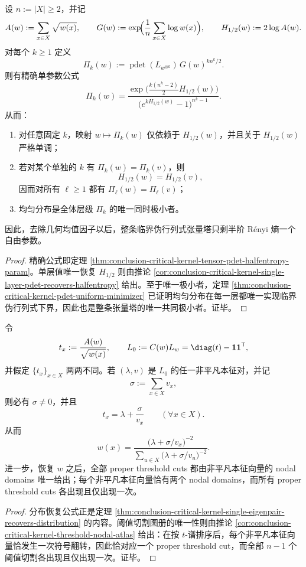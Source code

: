 \begin{theorem}[临界最优核张量塔的半熵刚性]\label{thm:conclusion-endpoint-halfentropy-pdet-tower-rigidity}
设 \(n:=|X|\ge 2\)，并记
\[
A(w):=\sum_{x\in X}\sqrt{w(x)},
\qquad
G(w):=\exp\!\Bigl(\frac1n\sum_{x\in X}\log w(x)\Bigr),
\qquad
H_{1/2}(w):=2\log A(w).
\]
对每个 \(k\ge 1\) 定义
\[
\Pi_k(w):=\operatorname{pdet}(L_{w^{\otimes k}})\,G(w)^{k n^k/2}.
\]
则有精确单参数公式
\[
\Pi_k(w)
=
\frac{\exp\!\bigl(\frac{k(n^k-2)}{2}H_{1/2}(w)\bigr)}
{\bigl(e^{kH_{1/2}(w)}-1\bigr)^{n^k-1}}.
\]
从而：
\begin{enumerate}
  \item 对任意固定 \(k\)，映射 \(w\mapsto \Pi_k(w)\) 仅依赖于 \(H_{1/2}(w)\)，并且关于 \(H_{1/2}(w)\) 严格单调；
  \item 若对某个单独的 \(k\) 有 \(\Pi_k(w)=\Pi_k(v)\)，则
  \[
  H_{1/2}(w)=H_{1/2}(v),
  \]
  因而对所有 \(\ell\ge 1\) 都有 \(\Pi_\ell(w)=\Pi_\ell(v)\)；
  \item 均匀分布是全体层级 \(\Pi_k\) 的唯一同时极小者。
\end{enumerate}
因此，去除几何均值因子以后，整条临界伪行列式张量塔只剩半阶 R\'enyi 熵一个自由参数。
\end{theorem}
\begin{proof}
精确公式即定理 \ref{thm:conclusion-critical-kernel-tensor-pdet-halfentropy-param}。单层值唯一恢复 \(H_{1/2}\) 则由推论 \ref{cor:conclusion-critical-kernel-single-layer-pdet-recovers-halfentropy} 给出。至于唯一极小者，定理 \ref{thm:conclusion-critical-kernel-pdet-uniform-minimizer} 已证明均匀分布在每一层都唯一实现临界伪行列式下界，因此也是整条张量塔的唯一共同极小者。证毕。
\end{proof}

\begin{theorem}[单一非平凡本征对即可反演整个阈值图册]\label{thm:conclusion-endpoint-single-eigenpair-inverts-threshold-atlas}
令
\[
t_x:=\frac{A(w)}{\sqrt{w(x)}},
\qquad
L_0:=C(w)L_w=\diag(t)-\mathbf 1\mathbf 1^{\mathsf T},
\]
并假定 \(\{t_x\}_{x\in X}\) 两两不同。若 \((\lambda,v)\) 是 \(L_0\) 的任一非平凡本征对，并记
\[
\sigma:=\sum_{x\in X}v_x,
\]
则必有 \(\sigma\ne 0\)，并且
\[
t_x=\lambda+\frac{\sigma}{v_x}\qquad(\forall x\in X).
\]
从而
\[
w(x)=
\frac{\bigl(\lambda+\sigma/v_x\bigr)^{-2}}
{\sum_{u\in X}\bigl(\lambda+\sigma/v_u\bigr)^{-2}}.
\]
进一步，恢复 \(w\) 之后，全部 proper threshold cuts 都由非平凡本征向量的 nodal domains 唯一给出；每个非平凡本征向量恰有两个 nodal domains，而所有 proper threshold cuts 各出现且仅出现一次。
\end{theorem}
\begin{proof}
分布恢复公式正是定理 \ref{thm:conclusion-critical-kernel-single-eigenpair-recovers-distribution} 的内容。阈值切割图册的唯一性则由推论 \ref{cor:conclusion-critical-kernel-threshold-nodal-atlas} 给出：在按 \(t\)-谱排序后，每个非平凡本征向量恰发生一次符号翻转，因此恰对应一个 proper threshold cut，而全部 \(n-1\) 个阈值切割各出现且仅出现一次。证毕。
\end{proof}

